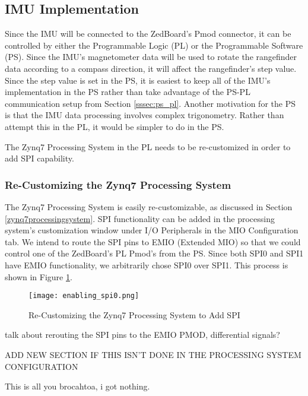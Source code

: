 \subsection{IMU Implementation}
Since the IMU will be connected to the ZedBoard's Pmod connector, it can be controlled by either the Programmable Logic (PL) or the Programmable Software (PS). Since the IMU's magnetometer data will be used to rotate the rangefinder data according to a compass direction, it will affect the rangefinder's step value. Since the step value is set in the PS, it is easiest to keep all of the IMU's implementation in the PS rather than take advantage of the PS-PL communication setup from Section \ref{sssec:ps_pl}. Another motivation for the PS is that the IMU data processing involves complex trigonometry. Rather than attempt this in the PL, it would be simpler to do in the PS.
\par
The Zynq7 Processing System in the PL needs to be re-customized in order to add SPI capability.

\subsubsection{Re-Customizing the Zynq7 Processing System}
The Zynq7 Processing System is easily re-customizable, as discussed in Section \ref{zynq7processingsystem}. SPI functionality can be added in the processing system's customization window under I/O Peripherals in the MIO Configuration tab. We intend to route the SPI pins to EMIO (Extended MIO) so that we could control one of the ZedBoard's PL Pmod's from the PS. Since both SPI0 and SPI1 have EMIO functionality, we arbitrarily chose SPI0 over SPI1. This process is shown in Figure \ref{enabling_spi0}.

\begin{figure}[H]
	\centerline{\texttt{[image: enabling\_spi0.png]}}
	\caption{Re-Customizing the Zynq7 Processing System to Add SPI}
	\label{enabling_spi0}
\end{figure}


\par
talk about rerouting the SPI pins to the EMIO PMOD, differential signals?
\par
ADD NEW SECTION IF THIS ISN'T DONE IN THE PROCESSING SYSTEM CONFIGURATION
\par
This is all you brocahtoa, i got nothing.






